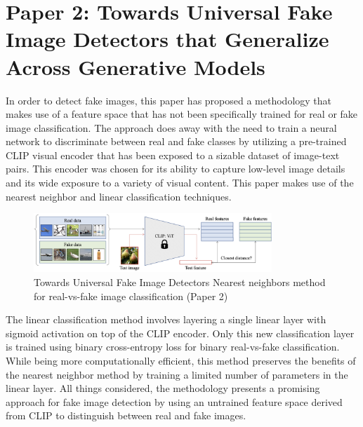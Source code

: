 \documentclass[a4paper,14pt]{report}
\begin{document}
\section{Paper 2: Towards Universal Fake Image Detectors that Generalize Across Generative Models}
In order to detect fake images, this paper has proposed a methodology that makes use of a feature space that has not been specifically trained for real or fake image classification. The approach does away with the need to train a neural network to discriminate between real and fake classes by utilizing a pre-trained CLIP visual encoder that has been exposed to a sizable dataset of image-text pairs. This encoder was chosen for its ability to capture low-level image details and its wide exposure to a variety of visual content. This paper makes use of the nearest neighbor and linear classification techniques.
\begin{figure}[H]
    \centering
    \includegraphics[width=0.8\textwidth]{Images/method_paper2.png}
    \caption{Towards Universal Fake Image Detectors Nearest neighbors method for real-vs-fake image classification (Paper 2)}
    \label{fig:methodology}
\end{figure}
The linear classification method involves layering a single linear layer with sigmoid activation on top of the CLIP encoder. Only this new classification layer is trained using binary cross-entropy loss for binary real-vs-fake classification. While being more computationally efficient, this method preserves the benefits of the nearest neighbor method by training a limited number of parameters in the linear layer. All things considered, the methodology presents a promising approach for fake image detection by using an untrained feature space derived from CLIP to distinguish between real and fake images.
\vspace{1cm}
\end{document}

